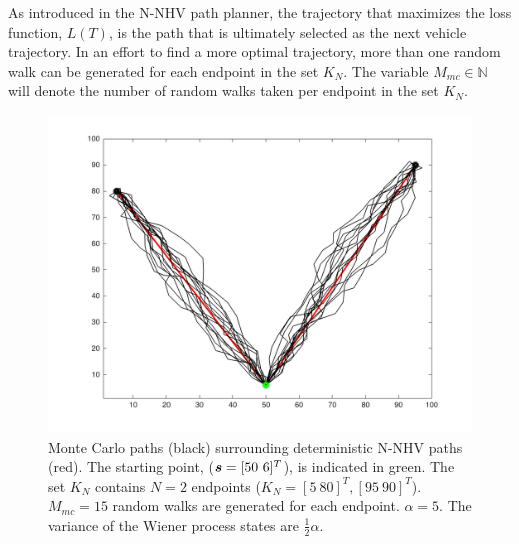 As introduced in the N-NHV path planner, the trajectory that maximizes the loss function, $L(T)$, is the path that is ultimately selected as the next vehicle trajectory. In an effort to find a more optimal trajectory, more than one random walk can be generated for each endpoint in the set $K_N$. The variable $M_{mc} \in \mathbb{N}$ will denote the number of random walks taken per endpoint in the set $K_N$.

\begin{figure}[h!]
	\centering
	\includegraphics[width=0.8\linewidth]{figures/brownian_motion_mc.png}
	\ssp
	\caption{ Monte Carlo paths (black) surrounding deterministic N-NHV paths (red). The starting point, (${\it{\boldsymbol{s}}} = [50 \ 6]^T$), is indicated in green. The set $K_N$ contains $N=2$ endpoints ($K_N = [ 5 \ 80 ]^T, [ 95 \ 90]^T$). $M_{mc}=15$ random walks are generated for each endpoint. $\alpha=5$. The variance of the Wiener process states are $\frac{1}{2} \alpha$.}

\end{figure}




